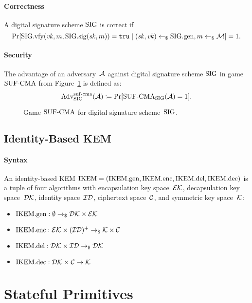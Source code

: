 \documentclass[a4paper,orivec]{llncs}
\begin{document}
\paragraph{Correctness}
A digital signature scheme $\mathrm{SIG}$ is correct if
\[
\Pr[\mathrm{SIG}.\mathrm{vfy}(\mathit{vk},m,\mathrm{SIG}.\mathrm{sig}(\mathit{sk},m))=\mathtt{tru}\mid (\mathit{sk},\mathit{vk})\gets_\$\mathrm{SIG}.\mathrm{gen},m\gets_\$\mathcal{M}]=1\text{.}
\]

\paragraph{Security}
The advantage of an adversary~$\mathcal{A}$ against digital signature scheme $\mathrm{SIG}$ in game ${\mathrm{SUF}\text{-}\mathrm{CMA}}$ from Figure~\ref{fig:sig:suf} is defined as:
\[
\mathrm{Adv}_{\mathrm{SIG}}^{\mathrm{suf}\text{-}\mathrm{cma}}(\mathcal{A})\coloneqq\Pr[{\mathrm{SUF}\text{-}\mathrm{CMA}}_{\mathrm{SIG}}(\mathcal{A})=1]\text{.}
\]

\begin{figure}[!ht]
    \centering
    \nicoresetlinenr%
    \fbox{%
        \scalebox{\codescalefactor}{%
        }%
    }
    \caption{%
        Game ${\mathrm{SUF}\text{-}\mathrm{CMA}}$ for digital signature scheme~$\mathrm{SIG}$.
    }
    \label{fig:sig:suf}
\end{figure}

\subsection{Identity-Based KEM}

\paragraph{Syntax}
An identity-based KEM $\mathrm{IKEM}=(\mathrm{IKEM}.\mathrm{gen},\mathrm{IKEM}.\mathrm{enc},\mathrm{IKEM}.\mathrm{del},\mathrm{IKEM}.\mathrm{dec})$ is a tuple of four algorithms with encapsulation key space~$\mathcal{EK}$, decapsulation key space~$\mathcal{DK}$, identity space~$\mathcal{ID}$, ciphertext space~$\mathcal{C}$, and symmetric key space~$\mathcal{K}$:

\begin{itemize}
    \item $\mathrm{IKEM}.\mathrm{gen}: \emptyset \to_\$ \mathcal{DK}\times\mathcal{EK}$
    \item $\mathrm{IKEM}.\mathrm{enc}: \mathcal{EK}\times(\mathcal{ID})^+ \to_\$ \mathcal{K}\times\mathcal{C}$
    \item $\mathrm{IKEM}.\mathrm{del}: \mathcal{DK}\times\mathcal{ID} \to_\$ \mathcal{DK}$
    \item $\mathrm{IKEM}.\mathrm{dec}: \mathcal{DK}\times\mathcal{C} \to \mathcal{K}$
\end{itemize}


\section{Stateful Primitives}
\end{document}
